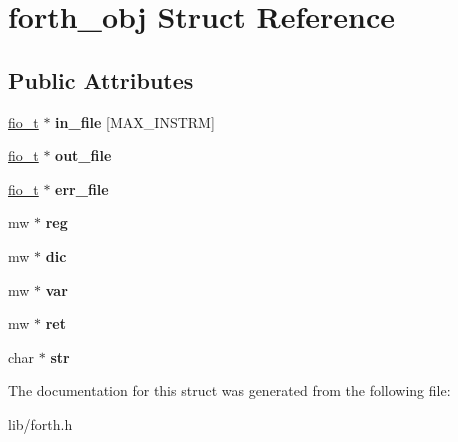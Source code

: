 \hypertarget{structforth__obj}{\section{forth\-\_\-obj Struct Reference}
\label{structforth__obj}
}
\subsection*{Public Attributes}
\begin{DoxyCompactItemize}
\item 
\hypertarget{structforth__obj_affea97aff17e933a7d4e97a1fb9bac3c}{\hyperlink{structfio__s}{fio\-\_\-t} $\ast$ {\bfseries in\-\_\-file} \mbox{[}M\-A\-X\-\_\-\-I\-N\-S\-T\-R\-M\mbox{]}}\label{structforth__obj_affea97aff17e933a7d4e97a1fb9bac3c}

\item 
\hypertarget{structforth__obj_a4350825bc239e615e506b0e049bae2e2}{\hyperlink{structfio__s}{fio\-\_\-t} $\ast$ {\bfseries out\-\_\-file}}\label{structforth__obj_a4350825bc239e615e506b0e049bae2e2}

\item 
\hypertarget{structforth__obj_a46cd12633b331e5dd923a0bcab6b5e4a}{\hyperlink{structfio__s}{fio\-\_\-t} $\ast$ {\bfseries err\-\_\-file}}\label{structforth__obj_a46cd12633b331e5dd923a0bcab6b5e4a}

\item 
\hypertarget{structforth__obj_aec82f9aa14ed1b88f71ca04ea1027dfa}{mw $\ast$ {\bfseries reg}}\label{structforth__obj_aec82f9aa14ed1b88f71ca04ea1027dfa}

\item 
\hypertarget{structforth__obj_a12eb705e425898a44f0f4ad087e48768}{mw $\ast$ {\bfseries dic}}\label{structforth__obj_a12eb705e425898a44f0f4ad087e48768}

\item 
\hypertarget{structforth__obj_a7e44fb7a44a10b0acbfdce4c919db914}{mw $\ast$ {\bfseries var}}\label{structforth__obj_a7e44fb7a44a10b0acbfdce4c919db914}

\item 
\hypertarget{structforth__obj_a3fbef0ce707c544c528376b2c9788dbc}{mw $\ast$ {\bfseries ret}}\label{structforth__obj_a3fbef0ce707c544c528376b2c9788dbc}

\item 
\hypertarget{structforth__obj_a7214c1e818fea38be42080ddf2d3406f}{char $\ast$ {\bfseries str}}\label{structforth__obj_a7214c1e818fea38be42080ddf2d3406f}

\end{DoxyCompactItemize}


The documentation for this struct was generated from the following file\-:\begin{DoxyCompactItemize}
\item 
lib/forth.\-h\end{DoxyCompactItemize}

